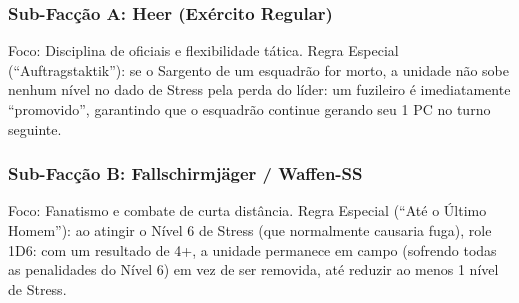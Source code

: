 \subsubsection{Sub-Facção A: Heer (Exército Regular)}

Foco: Disciplina de oficiais e flexibilidade tática. Regra Especial (``Auftragstaktik''): se o Sargento de um esquadrão for morto, a unidade não sobe nenhum nível no dado de Stress pela perda do líder: um fuzileiro é imediatamente ``promovido'', garantindo que o esquadrão continue gerando seu 1 PC no turno seguinte.

\subsubsection{Sub-Facção B: Fallschirmjäger / Waffen-SS}

Foco: Fanatismo e combate de curta distância. Regra Especial (``Até o Último Homem''): ao atingir o Nível 6 de Stress (que normalmente causaria fuga), role 1D6: com um resultado de 4+, a unidade permanece em campo (sofrendo todas as penalidades do Nível 6) em vez de ser removida, até reduzir ao menos 1 nível de Stress.
